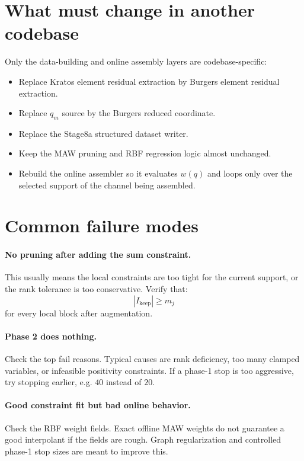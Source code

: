 \documentclass[11pt]{article}
\begin{document}
\section{What must change in another codebase}

Only the data-building and online assembly layers are codebase-specific:
\begin{itemize}
  \item Replace Kratos element residual extraction by Burgers element residual extraction.
  \item Replace \(q_m\) source by the Burgers reduced coordinate.
  \item Replace the Stage8a structured dataset writer.
  \item Keep the MAW pruning and RBF regression logic almost unchanged.
  \item Rebuild the online assembler so it evaluates \(w(q)\) and loops only over the
  selected support of the channel being assembled.
\end{itemize}

\section{Common failure modes}

\paragraph{No pruning after adding the sum constraint.}
This usually means the local constraints are too tight for the current support, or
the rank tolerance is too conservative.  Verify that:
\[
  |I_{\mathrm{keep}}|\ge m_j
\]
for every local block after augmentation.

\paragraph{Phase 2 does nothing.}
Check the top fail reasons.  Typical causes are rank deficiency, too many clamped
variables, or infeasible positivity constraints.  If a phase-1 stop is too aggressive,
try stopping earlier, e.g. \(40\) instead of \(20\).

\paragraph{Good constraint fit but bad online behavior.}
Check the RBF weight fields.  Exact offline MAW weights do not guarantee a good
interpolant if the fields are rough.  Graph regularization and controlled phase-1
stop sizes are meant to improve this.
\end{document}

